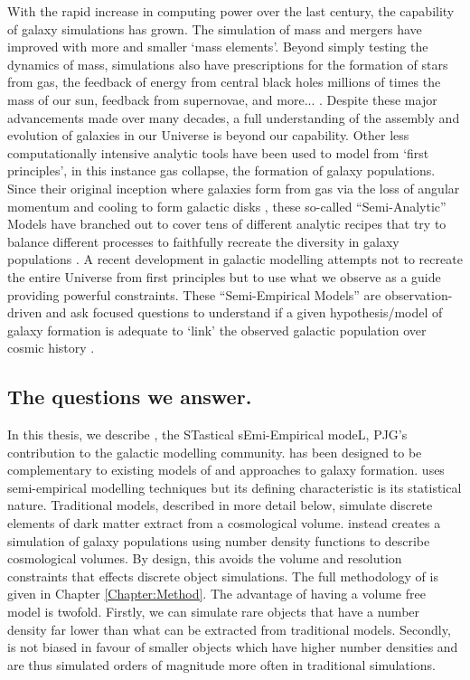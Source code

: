 With the rapid increase in computing power over the last century, the capability of galaxy simulations has grown. The simulation of mass and mergers have improved with more and smaller `mass elements'. Beyond simply testing the dynamics of mass, simulations also have prescriptions for the formation of stars from gas, the feedback of energy from central black holes millions of times the mass of our sun, feedback from supernovae, and more... \citep[e.g.,][]{McAlpine2015TheCatalogues, Pillepich2018FirstGalaxies}. Despite these major advancements made over many decades, a full understanding of the assembly and evolution of galaxies in our Universe is beyond our capability. Other less computationally intensive analytic tools have been used to model from `first principles', in this instance gas collapse, the formation of galaxy populations. Since their original inception where galaxies form from gas via the loss of angular momentum and cooling to form galactic disks \cite{Mo1998TheDiscs}, these so-called ``Semi-Analytic'' Models have branched out to cover tens of different analytic recipes that try to balance different processes to faithfully recreate the diversity in galaxy populations \citep[e.g.,][]{DeLucia2006TheGalaxies, Guo2011FromCosmology}. A recent development in galactic modelling attempts not to recreate the entire Universe from first principles but to use what we observe as a guide providing powerful constraints. These ``Semi-Empirical Models'' are observation-driven and ask focused questions to understand if a given hypothesis/model of galaxy formation is adequate to `link' the observed galactic population over cosmic history \citep{Hopkins2010MERGERSMATTER, Zavala2012, Moster2013, Shankar2014, Moster2018Emerge10}.

\subsection{The questions we answer.}
In this thesis, we describe \steel, the STastical sEmi-Empirical modeL, PJG's contribution to the galactic modelling community. \steel has been designed to be complementary to existing models of and approaches to galaxy formation. \steel uses semi-empirical modelling techniques but its defining characteristic is its statistical nature. Traditional models, described in more detail below, simulate discrete elements of dark matter extract from a cosmological volume. \steel instead creates a simulation of galaxy populations using number density functions to describe cosmological volumes. By design, this avoids the volume and resolution constraints that effects discrete object simulations. The full methodology of \steel is given in Chapter \ref{Chapter:Method}. The advantage of having a volume free model is twofold. Firstly, we can simulate rare objects that have a number density far lower than what can be extracted from traditional models. Secondly, \steel is not biased in favour of smaller objects which have higher number densities and are thus simulated orders of magnitude more often in traditional simulations.

